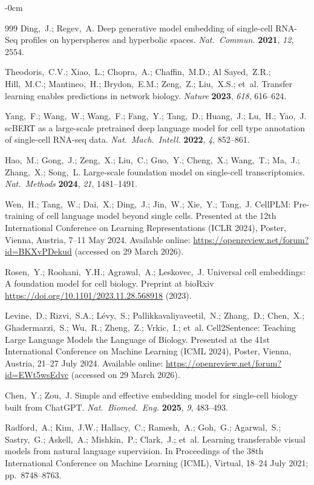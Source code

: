 \documentclass[genes,article,submit,pdftex,oneauthor]{Definitions/mdpi}
\begin{document}
\begin{adjustwidth}{-\extralength}{0cm}
\begin{thebibliography}{999}
Ding,~J.; Regev,~A. Deep generative model embedding of single-cell RNA-Seq profiles on hyperspheres and hyperbolic spaces. {\em Nat.\ Commun.} {\bf 2021}, {\em 12}, 2554.

Theodoris,~C.V.; Xiao,~L.; Chopra,~A.; Chaffin,~M.D.; Al Sayed,~Z.R.; Hill,~M.C.; Mantineo,~H.; Brydon,~E.M.; Zeng,~Z.; Liu,~X.S.; et~al. Transfer learning enables predictions in network biology. {\em Nature} {\bf 2023}, {\em 618}, 616--624.

Yang,~F.; Wang,~W.; Wang,~F.; Fang,~Y.; Tang,~D.; Huang,~J.; Lu,~H.; Yao,~J. scBERT as a large-scale pretrained deep language model for cell type annotation of single-cell RNA-seq data. {\em Nat.\ Mach.\ Intell.} {\bf 2022}, {\em 4}, 852--861.

Hao,~M.; Gong,~J.; Zeng,~X.; Liu,~C.; Guo,~Y.; Cheng,~X.; Wang,~T.; Ma,~J.; Zhang,~X.; Song,~L. Large-scale foundation model on single-cell transcriptomics. {\em Nat.\ Methods} {\bf 2024}, {\em 21}, 1481--1491.

Wen,~H.; Tang,~W.; Dai,~X.; Ding,~J.; Jin,~W.; Xie,~Y.; Tang,~J. CellPLM: Pre-training of cell language model beyond single cells. Presented at the 12th International Conference on Learning Representations (ICLR 2024), Poster, Vienna, Austria, 7--11 May 2024. Available online: \url{https://openreview.net/forum?id=BKXvPDekud} (accessed on 29 March 2026).

Rosen,~Y.; Roohani,~Y.H.; Agrawal,~A.; Leskovec,~J. Universal cell embeddings: A foundation model for cell biology. Preprint at bioRxiv \url{https://doi.org/10.1101/2023.11.28.568918} (2023).

Levine,~D.; Rizvi,~S.A.; L\'{e}vy,~S.; Pallikkavaliyaveetil,~N.; Zhang,~D.; Chen,~X.; Ghadermarzi,~S.; Wu,~R.; Zheng,~Z.; Vrkic,~I.; et~al. Cell2Sentence: Teaching Large Language Models the Language of Biology. Presented at the 41st International Conference on Machine Learning (ICML 2024), Poster, Vienna, Austria, 21--27 July 2024. Available online: \url{https://openreview.net/forum?id=EWt5wsEdvc} (accessed on 29 March 2026).

Chen,~Y.; Zou,~J. Simple and effective embedding model for single-cell biology built from ChatGPT. {\em Nat.\ Biomed.\ Eng.} {\bf 2025}, {\em 9}, 483--493.

Radford,~A.; Kim,~J.W.; Hallacy,~C.; Ramesh,~A.; Goh,~G.; Agarwal,~S.; Sastry,~G.; Askell,~A.; Mishkin,~P.; Clark,~J.; et~al. Learning transferable visual models from natural language supervision. In Proceedings of the 38th International Conference on Machine Learning (ICML), Virtual, 18--24 July 2021; pp.\ 8748--8763.


\end{thebibliography}
\end{adjustwidth}
\end{document}
